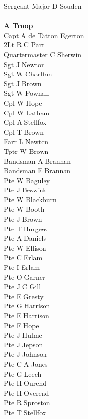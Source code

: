 \begin{multicols}{2}
  \noindent
  Sergeant Major D Souden \\
  \\
  \textbf{A Troop} \\
  Capt A de Tatton Egerton \\
  2Lt R C Parr \\
  Quartermaster C Sherwin \\
  Sgt J Newton \\
  Sgt W Chorlton \\
  Sgt J Brown \\
  Sgt W Pownall \\
  Cpl W Hope \\
  Cpl W Latham \\
  Cpl A Stellfox \\
  Cpl T Brown \\
  Farr L Newton \\
  Tptr W Brown \\
  Bandsman A Brannan \\
  Bandsman E Brannan \\
  Pte W Baguley \\
  Pte J Beswick \\
  Pte W Blackburn \\
  Pte W Booth \\
  Pte J Brown \\
  Pte T Burgess \\
  Pte A Daniels \\
  Pte W Ellison \\
  Pte C Erlam \\
  Pte I Erlam \\
  Pte O Garner \\
  Pte J C Gill \\
  Pte E Gresty \\
  Pte G Harrison \\
  Pte E Harrison \\
  Pte F Hope \\
  Pte J Hulme \\
  Pte J Jepson \\
  Pte J Johnson \\
  Pte C A Jones \\
  Pte G Leech \\
  Pte H Ourend \\
  Pte H Overend \\
  Pte R Sproston \\
  Pte T Stellfox \\

\end{multicols}
